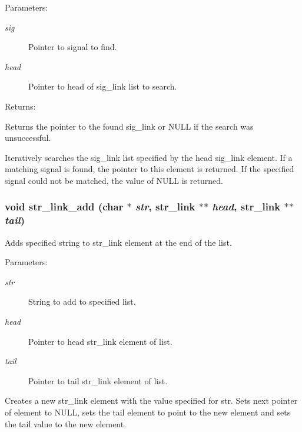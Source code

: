 \begin{Desc}
\item[Parameters: ]\par
\begin{description}
\item[{\em 
sig}]Pointer to signal to find. \item[{\em 
head}]Pointer to head of sig\_\-link list to search. \end{description}
\end{Desc}
\begin{Desc}
\item[Returns: ]\par
Returns the pointer to the found sig\_\-link or NULL if the search was unsuccessful.\end{Desc}
Iteratively searches the sig\_\-link list specified by the head sig\_\-link element. If a matching signal is found, the pointer to this element is returned. If the specified signal could not be matched, the value of NULL is returned. 
\subsubsection{\setlength{\rightskip}{0pt plus 5cm}void str\_\-link\_\-add (char $\ast$ {\em str}, {\bf str\_\-link} $\ast$$\ast$ {\em head}, {\bf str\_\-link} $\ast$$\ast$ {\em tail})}\label{link_8c_a0}


Adds specified string to str\_\-link element at the end of the list.

\begin{Desc}
\item[Parameters: ]\par
\begin{description}
\item[{\em 
str}]String to add to specified list. \item[{\em 
head}]Pointer to head str\_\-link element of list. \item[{\em 
tail}]Pointer to tail str\_\-link element of list.\end{description}
\end{Desc}
Creates a new str\_\-link element with the value specified for str. Sets next pointer of element to NULL, sets the tail element to point to the new element and sets the tail value to the new element. 
